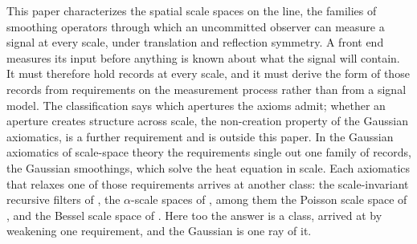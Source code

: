 This paper characterizes the spatial scale spaces on the line, the families of smoothing
operators through which an uncommitted observer can measure a signal at every scale, under
translation and reflection symmetry. A front end measures its input before anything is
known about what the signal will contain. It must therefore hold records at every scale,
and it must derive the form of those records from requirements on the measurement process
rather than from a signal model. The classification says which apertures the axioms
admit; whether an aperture creates structure across scale, the non-creation property of
the Gaussian axiomatics, is a further requirement and is outside this paper. In the
Gaussian axiomatics of scale-space theory
the requirements single out one family of records, the Gaussian smoothings, which solve the
heat equation in scale. Each axiomatics that relaxes one of those requirements arrives at
another class: the scale-invariant recursive filters of , the
$\alpha$-scale spaces of , among them the Poisson scale space of
, and the Bessel scale space of . Here
too the answer is a class, arrived at by weakening one requirement, and the Gaussian is one
ray of it.

